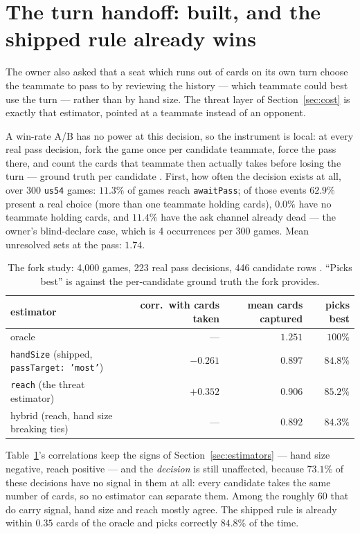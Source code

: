 \documentclass[11pt]{article}
\newcommand{\code}[1]{\texttt{#1}}
\newcommand{\usff}{\code{us54}}
\begin{document}
\section{The turn handoff: built, and the shipped rule already wins}
\label{sec:handoff}

The owner also asked that a seat which runs out of cards on its own turn choose the teammate to pass
to by reviewing the history --- which teammate could best use the turn --- rather than by hand size.
The threat layer of Section~\ref{sec:cost} is exactly that estimator, pointed at a teammate instead
of an opponent.

A win-rate A/B has no power at this decision, so the instrument is local: at every real pass
decision, fork the game once per candidate teammate, force the pass there, and count the cards that
teammate then actually takes before losing the turn --- ground truth per candidate
\cite{concession}. First, how often the decision exists at all, over 300 \usff{} games: $11.3\%$ of
games reach \code{awaitPass}; of those events $62.9\%$ present a real choice (more than one teammate
holding cards), $0.0\%$ have no teammate holding cards, and $11.4\%$ have the ask channel already
dead --- the owner's blind-declare case, which is 4 occurrences per 300 games. Mean unresolved sets
at the pass: $1.74$.

\begin{table}[t]
\centering
\caption{The fork study: 4{,}000 games, 223 real pass decisions, 446 candidate rows
\cite{concession}. ``Picks best'' is against the per-candidate ground truth the fork provides.}
\label{tab:handoff}
\footnotesize
\begin{tabular}{@{}lrrr@{}}
\toprule
estimator & corr.\ with cards taken & mean cards captured & picks best \\
\midrule
oracle & --- & $1.251$ & $100\%$ \\
\code{handSize} (shipped, \code{passTarget: 'most'}) & $\mathbf{-0.261}$ & $\mathbf{0.897}$ & $\mathbf{84.8\%}$ \\
\code{reach} (the threat estimator) & $\mathbf{+0.352}$ & $0.906$ & $85.2\%$ \\
hybrid (reach, hand size breaking ties) & --- & $0.892$ & $84.3\%$ \\
\bottomrule
\end{tabular}
\end{table}

Table~\ref{tab:handoff}'s correlations keep the signs of Section~\ref{sec:estimators} --- hand size
negative, reach positive --- and the \emph{decision} is still unaffected, because $\mathbf{73.1\%}$
of these decisions have no signal in them at all: every candidate takes the same number of cards, so
no estimator can separate them. Among the roughly 60 that do carry signal, hand size and reach
mostly agree. The shipped rule is already within $0.35$ cards of the oracle and picks correctly
$84.8\%$ of the time.
\end{document}
